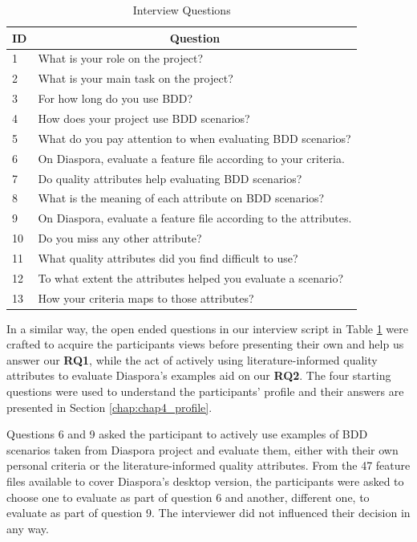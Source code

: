 \begin{table}[t]
	\caption{Interview Questions}
	\label{tbl:questions}
	\centering
	\begin{tabular}{|m{0.5cm}|m{12cm}|}
		\hline
		\multicolumn{1}{|c|}{\textbf{ID}} & \multicolumn{1}{|c|}{\textbf{Question}}\\
		\hline
		1 & What is your role on the project?\\
		\hline
		2 & What is your main task on the project?\\
		\hline
		3 & For how long do you use BDD?\\
		\hline
		4 & How does your project use BDD scenarios?\\
		\hline
		5 & What do you pay attention to when evaluating BDD scenarios?\\
		\hline
		6 & On Diaspora, evaluate a feature file according to your criteria.\\
		\hline
		7 & Do quality attributes help evaluating BDD scenarios?\\
		\hline
		8 & What is the meaning of each attribute on BDD scenarios?\\
		\hline
		9 & On Diaspora, evaluate a feature file according to the attributes.\\
		\hline
		10 & Do you miss any other attribute?\\
		\hline
		11 & What quality attributes did you find difficult to use?\\
		\hline
		12 & To what extent the attributes helped you evaluate a scenario?\\
		\hline
		13 & How your criteria maps to those attributes?\\
		\hline
	\end{tabular}
\end{table}

In a similar way, the open ended questions in our interview script in Table \ref{tbl:questions} were crafted to acquire the participants views before presenting their own and help us answer our \textbf{RQ1}, while the act of actively using literature-informed quality attributes to evaluate Diaspora's examples aid on our \textbf{RQ2}. The four starting questions were used to understand the participants' profile and their answers are presented in Section \ref{chap:chap4_profile}. 

Questions 6 and 9 asked the participant to actively use examples of BDD scenarios taken from Diaspora project and evaluate them, either with their own personal criteria or the literature-informed quality attributes. From the 47 feature files available to cover Diaspora's desktop version, the participants were asked to choose one to evaluate as part of question 6 and another, different one, to evaluate as part of question 9. The interviewer did not influenced their decision in any way. 

